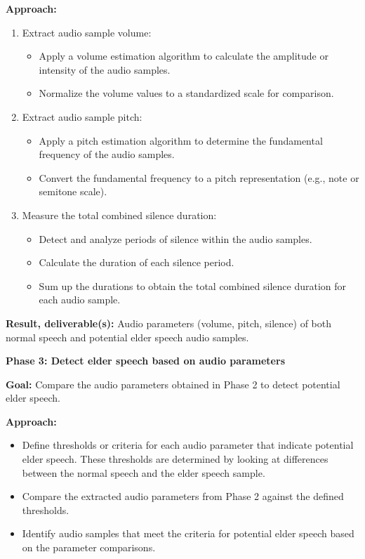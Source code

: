 \documentclass[english]{hogent-article}
\begin{document}
\textbf{Approach:}
\begin{enumerate}
    \item Extract audio sample volume:
    \begin{itemize}
        \item Apply a volume estimation algorithm to calculate the amplitude or intensity of the audio samples.
        \item Normalize the volume values to a standardized scale for comparison.
    \end{itemize}
    \item Extract audio sample pitch:
    \begin{itemize}
        \item Apply a pitch estimation algorithm to determine the fundamental frequency of the audio samples.
        \item Convert the fundamental frequency to a pitch representation (e.g., note or semitone scale).
    \end{itemize}
    \item Measure the total combined silence duration:
    \begin{itemize}
        \item Detect and analyze periods of silence within the audio samples.
        \item Calculate the duration of each silence period.
        \item Sum up the durations to obtain the total combined silence duration for each audio sample.
    \end{itemize}
\end{enumerate}

\textbf{Result, deliverable(s):} Audio parameters (volume, pitch, silence) of both normal speech and potential elder speech audio samples.

\textbf{Phase 3: Detect elder speech based on audio parameters}

\textbf{Goal:} Compare the audio parameters obtained in Phase 2 to detect potential elder speech.

\textbf{Approach:}
\begin{itemize}
    \item Define thresholds or criteria for each audio parameter that indicate potential elder speech. These thresholds are determined by looking at differences between the normal speech and the elder speech sample.
    \item Compare the extracted audio parameters from Phase 2 against the defined thresholds.
    \item Identify audio samples that meet the criteria for potential elder speech based on the parameter comparisons.
\end{itemize}
\end{document}
